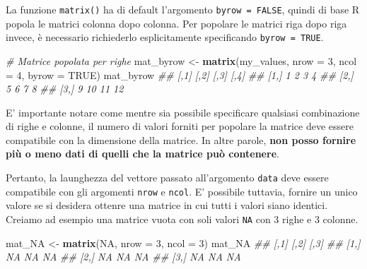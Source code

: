 \documentclass[
]{book}
\newenvironment{Shaded}{\begin{snugshade}}{\end{snugshade}}
\newcommand{\CommentTok}[1]{\textcolor[rgb]{0.56,0.35,0.01}{\textit{#1}}}
\newcommand{\DataTypeTok}[1]{\textcolor[rgb]{0.13,0.29,0.53}{#1}}
\newcommand{\DecValTok}[1]{\textcolor[rgb]{0.00,0.00,0.81}{#1}}
\newcommand{\KeywordTok}[1]{\textcolor[rgb]{0.13,0.29,0.53}{\textbf{#1}}}
\newcommand{\NormalTok}[1]{#1}
\newcommand{\OtherTok}[1]{\textcolor[rgb]{0.56,0.35,0.01}{#1}}
\newcommand{\StringTok}[1]{\textcolor[rgb]{0.31,0.60,0.02}{#1}}
\begin{document}
La funzione \texttt{matrix()} ha di default l'argomento \texttt{byrow\ =\ FALSE}, quindi di base R popola le matrici colonna dopo colonna. Per popolare le matrici riga dopo riga invece, è necessario richiederlo esplicitamente specificando \texttt{byrow\ =\ TRUE}.

\begin{Shaded}
\begin{Highlighting}[]
\CommentTok{# Matrice popolata per righe}
\NormalTok{mat_byrow <-}\StringTok{ }\KeywordTok{matrix}\NormalTok{(my_values, }\DataTypeTok{nrow =} \DecValTok{3}\NormalTok{, }\DataTypeTok{ncol =} \DecValTok{4}\NormalTok{, }\DataTypeTok{byrow =} \OtherTok{TRUE}\NormalTok{)}
\NormalTok{mat_byrow}
\CommentTok{##      [,1] [,2] [,3] [,4]}
\CommentTok{## [1,]    1    2    3    4}
\CommentTok{## [2,]    5    6    7    8}
\CommentTok{## [3,]    9   10   11   12}
\end{Highlighting}
\end{Shaded}

E' importante notare come mentre sia possibile specificare qualsiasi combinazione di righe e colonne, il numero di valori forniti per popolare la matrice deve essere compatibile con la dimensione della matrice. In altre parole, \textbf{non posso fornire più o meno dati di quelli che la matrice può contenere}.

Pertanto, la launghezza del vettore passato all'argomento \texttt{data} deve essere compatibile con gli argomenti \texttt{nrow} e \texttt{ncol}. E' possibile tuttavia, fornire un unico valore se si desidera ottenre una matrice in cui tutti i valori siano identici. Creiamo ad esempio una matrice vuota con soli valori \texttt{NA} con 3 righe e 3 colonne.

\begin{Shaded}
\begin{Highlighting}[]
\NormalTok{mat_NA <-}\StringTok{ }\KeywordTok{matrix}\NormalTok{(}\OtherTok{NA}\NormalTok{, }\DataTypeTok{nrow =} \DecValTok{3}\NormalTok{, }\DataTypeTok{ncol =} \DecValTok{3}\NormalTok{)}
\NormalTok{mat_NA}
\CommentTok{##      [,1] [,2] [,3]}
\CommentTok{## [1,]   NA   NA   NA}
\CommentTok{## [2,]   NA   NA   NA}
\CommentTok{## [3,]   NA   NA   NA}
\end{Highlighting}
\end{Shaded}
\end{document}
